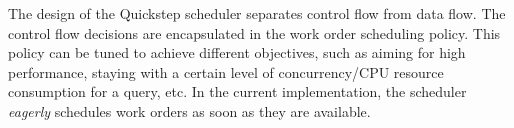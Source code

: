 The design of the Quickstep scheduler separates control flow from data flow.
The control flow decisions are encapsulated in the work order scheduling policy.
This policy can be tuned to achieve different objectives, such as aiming for high performance, staying with a certain level of concurrency/CPU resource consumption for a query, etc.
In the current implementation, the scheduler \textit{eagerly} schedules work orders as soon as they are available.




